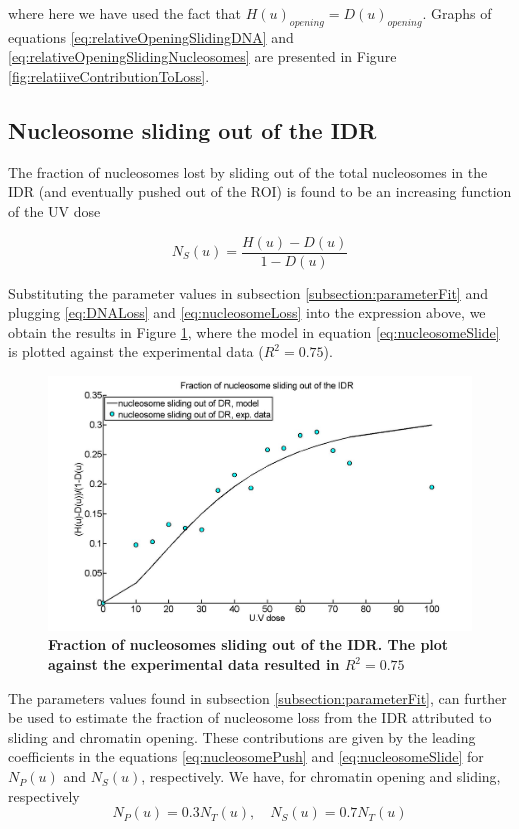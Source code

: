 \documentclass[12pt]{article}
\begin{document}
where here we have used the fact that $H(u)_{opening} = D(u)_{opening}$. Graphs of
equations \eqref{eq:relativeOpeningSlidingDNA} and \eqref{eq:relativeOpeningSlidingNucleosomes}  are presented in Figure \ref{fig:relatiiveContributionToLoss}.

\subsection{Nucleosome sliding out of the IDR}
The fraction of nucleosomes lost by sliding out of the total nucleosomes in the IDR
(and eventually pushed out of the ROI) is found to be an increasing function
of the UV dose

\begin{equation*}
N_S(u) = \frac{H(u)-D(u)}{1-D(u)}
\end{equation*}

Substituting the parameter values in subsection \ref{subsection:parameterFit} and plugging \eqref{eq:DNALoss} and \eqref{eq:nucleosomeLoss} into the expression above, we obtain the results in Figure \ref{fig:fractionSlidingOutOfIDR}, where the model
in equation \eqref{eq:nucleosomeSlide} is plotted against the experimental data ($R^2 = 0.75$).

\begin{figure}
\centering
\includegraphics[width=0.5\linewidth, height=0.3\textheight]{fractionSlidingOutOfIDR}
\caption{\textbf{Fraction of nucleosomes sliding out of the IDR. The plot
		against the experimental data resulted in $R^2 = 0.75$}}
\label{fig:fractionSlidingOutOfIDR}
\end{figure}

The parameters values found in subsection \ref{subsection:parameterFit}, can further be used to estimate the fraction of nucleosome loss from the IDR attributed to sliding and
chromatin opening. These contributions are given by the leading coefficients
in the equations \eqref{eq:nucleosomePush} and \eqref{eq:nucleosomeSlide} for $N_P(u)$ and $N_S(u)$, respectively. We have, for
chromatin opening and sliding, respectively
\begin{equation*}
N_P(u) = 0.3N_T(u),\quad N_S(u) = 0.7N_T(u)
\end{equation*}
\end{document}
